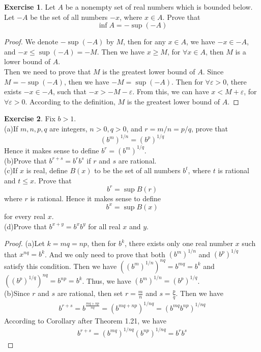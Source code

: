 \documentclass[12pt]{extarticle}
\newcommand{\<}{\langle}
\renewcommand{\>}{\rangle}
\theoremstyle{definition}
\newtheorem{exercise}{Exercise}
\begin{document}
\begin{exercise}
Let $A$ be a nonempty set of real numbers which is bounded below. Let $-A$ be the set of all numbers $-x$, where $x\in A$. Prove that 
$$\inf A = - \sup (-A)$$
\end{exercise}
\begin{proof}
We denote $- \sup (-A)$ by $M$, then for any $x \in A$, we have $-x \in -A$, and $-x \leq \sup (-A) = -M$. Then we have $x \geq M$, for $\forall x \in A$, then $M$ is a lower bound of $A$.\\
\hspace*{3em} Then we need to prove that $M$ is the greatest lower bound of $A$. Since $M = - \sup (-A)$, then we have $-M = \sup (-A)$. Then for $\forall \varepsilon > 0$, there exists $-x \in -A$, such that $-x > -M - \varepsilon$. From this, we can have $x < M + \varepsilon$, for $\forall \varepsilon > 0$. According to the definition, $M$ is the greatest lower bound of $A$.
\end{proof}

\medskip

\begin{exercise}
Fix $b>1$.\\
\hspace*{3em}(a)If $m,n,p,q$ are integers, $n>0, q>0$, and $r=m/n=p/q$, prove that 
$$(b^m)^{1/n}=(b^p)^{1/q}$$
Hence it makes sense to define $b^r=(b^m)^{1/q}$.\\
\hspace*{3em}(b)Prove that $b^{r+s}=b^r b^s$ if $r$ and $s$ are rational.\\
\hspace*{3em}(c)If $x$ is real, define $B(x)$ to be the set of all numbers $b^t$, where $t$ is rational and $t\leq x$. Prove that 
$$b^r=\sup B(r)$$
where $r$ is rational. Hence it makes sense to define
$$b^x=\sup B(x)$$
for every real $x$.\\
\hspace*{3em}(d)Prove that $b^{x+y}=b^x b^y$ for all real $x$ and $y$.
\end{exercise}
\begin{proof}
(a)Let $k=mq=np$, then for $b^k$, there exists only one real number $x$ such that $x^{nq}=b^k$. And we only need to prove that both $(b^m)^{1/n}$ and $(b^p)^{1/q}$ satisfy this condition. Then we have $\left((b^m)^{1/n}\right)^{nq} = b^{mq} = b^k$ and $\left((b^p)^{1/q}\right)^{nq} = b^{np} = b^k$. Thus, we have  $(b^m)^{1/n}=(b^p)^{1/q}$.\\
\hspace*{3em}(b)Since $r$ and $s$ are rational, then set $r = \frac{m}{n}$ and $s = \frac{p}{q}$. Then we have
\begin{align*}
    b^{r+s} = b^{\frac{mq+np}{nq}} = \left(b^{mq+np} \right)^{1/nq} = (b^{mq} b^{np})^{1/nq}
\end{align*}
According to Corollary after Theorem 1.21, we have
\begin{align*}
    b^{r+s} = (b^{mq})^{1/nq} (b^{np})^{1/nq} = b^r b^s
\end{align*}
\end{proof}
\end{document}
